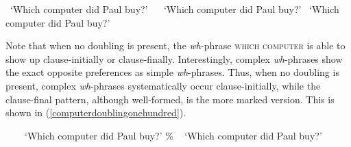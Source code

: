 \begin{exe}
\ex\label{computerdoubling}
\begin{xlist}
\ex *
%
\glt \textcolor{white}{*}`Which computer did Paul buy?' \label{ex:computerdoublinga}
\ex \textcolor{white}{*}
%
\glt \textcolor{white}{*}`Which computer did Paul buy?' \label{ex:computerdoublingb}
\ex *
%
\glt \textcolor{white}{*}`Which computer did Paul buy?' \label{ex:computerdoublingc}

\end{xlist}
\end{exe}

\noindent  Note that when no doubling is present, the \textit{wh}-phrase \textsc{which computer} is able to show up clause-initially or clause-finally. Interestingly, complex \textit{wh}-phrases show the exact opposite preferences as simple \textit{wh}-phrases. Thus, when no doubling is present, complex \textit{wh}-phrases systematically occur clause-initially, while the clause-final pattern, although well-formed, is the more marked version. This is shown in (\ref{computerdoublingonehundred}).

\begin{exe}
\ex\label{computerdoublingonehundred}
\begin{xlist}
\ex \textcolor{white}{\%}
%
\glt \textcolor{white}{\%}`Which computer did Paul buy?' \label{ex:computerdoublingonehundreda}
\ex \%
%
\glt \textcolor{white}{\%}`Which computer did Paul buy?' \label{ex:computerdoublingonehundredb}
\end{xlist}
\end{exe}


